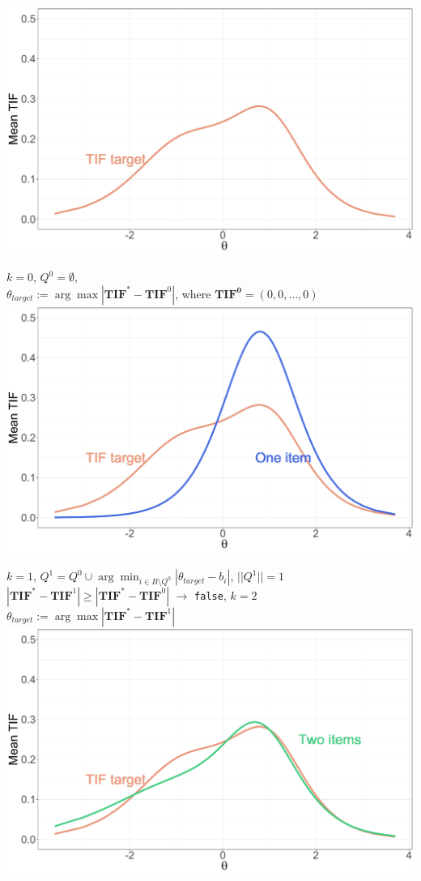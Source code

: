 \documentclass[aspectratio=149, compress]{beamer}
\begin{document}
\begin{frame}


		\begin{overprint}
	\footnotesize
	

	
%	
	
	\centering
	\includegraphics[width=.60\textwidth]{img/TIF-target.pdf}
	
	$k = 0$,	$Q^0 = \emptyset$, \\ $\theta_{target} := \arg\max |\mathbf{TIF}^* - \mathbf{TIF}^{0}|$, where $\mathbf{TIF^0} = (0, 0, \ldots, 0)$ \\
	
	
	\onslide<2>
	\centering
	\includegraphics[width=.60\textwidth]{img/TIF-first.pdf}
	
	$k = 1$, $Q^1 = Q^{0} \cup \arg\min_{i \in B\setminus Q^0} |\theta_{target} - b_i|$, 	$||Q^1|| = 1$ 
	$|\mathbf{TIF}^* - \mathbf{TIF}^1| \geq |\mathbf{TIF}^* - \mathbf{TIF}^{0}|$ $\rightarrow$ \texttt{false}, $k = 2$\\
	$\theta_{target} := \arg\max |\mathbf{TIF}^* - \mathbf{TIF}^{1}|$\\
	
	\onslide<3>\centering
	\includegraphics[width=.60\textwidth]{img/TIF-second.pdf}
	

\end{overprint}
\end{frame}
\end{document}
